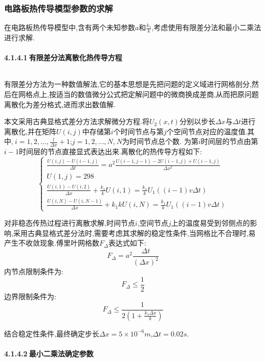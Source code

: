 \documentclass[12pt]{ctexart}
\numberwithin{figure}{section}
\numberwithin{table}{section}
\begin{document}
\subsubsection{电路板热传导模型参数的求解}
在电路板热传导模型中,含有两个未知参数$a$和$\frac{k_1}{k}$,考虑使用有限差分法和最小二乘法进行求解.
\paragraph{4.1.4.1$\ $有限差分法离散化热传导方程}$\ $

有限差分方法为一种数值解法,它的基本思想是先把问题的定义域进行网格剖分,然后在网格点上,按适当的数值微分公式把定解问题中的微商换成差商,从而把原问题离散化为差分格式,进而求出数值解.

本文采用古典显格式差分方法求解微分方程.将$U_2(x,t)$分别以步长$\Delta x$与$\Delta t$进行离散化,并在矩阵$U(i,j)$中存储第$i$个时间节点与第$j$个空间节点对应的温度值.其中,$\ i=1,2,\dots,\frac{l}{\Delta x}+1$;$j=1,2,\dots,N$,$\ N$为时间节点总个数.
为第$i$时间层的节点由第$i-1$时间层的节点直接显式表达出来.离散化的热传导方程如下:
\begin{equation}
\left\{
\begin{array}{cc}
  \frac{U(i,j)-U(i-1,j)}{\Delta t}=a^2\frac{U(i-1,j-1)-2U(i-1,j)+U(i-1,j)}{\Delta x^2}\\
  U(1,j)=298\\
  \frac{U(i,1)-U(i,2)}{\Delta x}+\frac{k_1}{k}U(i,1)=\frac{k_1}{k}U_1((i-1)v\Delta t)\\
  \frac{U(i,N)-U(i,N-1)}{\Delta x}+{k_1}{k}U(i,N)=\frac{k_1}{k}U_1((i-1)v\Delta t)
\end{array}\right. 
\end{equation}


对非稳态传热过程进行离散求解,时间节点$i$,空间节点$j$上的温度易受到邻侧点的影响,采用古典显格式差分法时,需要考虑其求解的稳定性条件,当网格比不合理时,易产生不收敛现象.傅里叶网格数$F_\Delta$表达式如下:
\begin{equation}
F_\Delta=a^2\frac{\Delta t}{(\Delta x)^2}
\end{equation}
内节点限制条件为:
\begin{equation}
F_\Delta\leq \frac{1}{2}
\end{equation}
边界限制条件为:
\begin{equation}
F_\Delta\leq \frac{1}{2(1+\frac{k_1\Delta x}{k})}
\end{equation}

结合稳定性条件,最终确定步长$\Delta x=5\times10^{-6}m$,$\Delta t=0.02s$.
\paragraph{4.1.4.2$\ $最小二乘法确定参数}$\ $
\end{document}
